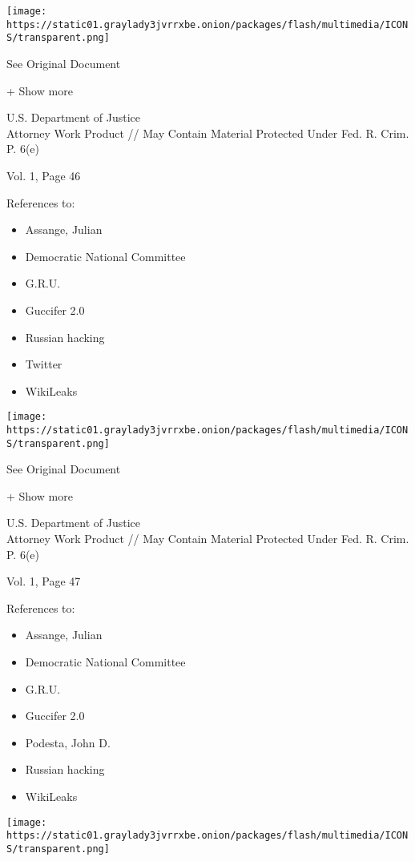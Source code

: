 \texttt{[image: https://static01.graylady3jvrrxbe.onion/packages/flash/multimedia/ICONS/transparent.png]}

See Original Document

+ Show more

U.S. Department of Justice\\
Attorney Work Product // May Contain Material Protected Under Fed. R.
Crim. P. 6(e)

Vol. 1, Page 46

References to:

\begin{itemize}
\tightlist
\item
  Assange, Julian
\item
  Democratic National Committee
\item
  G.R.U.
\item
  Guccifer 2.0
\item
  Russian hacking
\item
  Twitter
\item
  WikiLeaks
\end{itemize}

\protect\hyperlink{}{}

\texttt{[image: https://static01.graylady3jvrrxbe.onion/packages/flash/multimedia/ICONS/transparent.png]}

See Original Document

+ Show more

U.S. Department of Justice\\
Attorney Work Product // May Contain Material Protected Under Fed. R.
Crim. P. 6(e)

Vol. 1, Page 47

References to:

\begin{itemize}
\tightlist
\item
  Assange, Julian
\item
  Democratic National Committee
\item
  G.R.U.
\item
  Guccifer 2.0
\item
  Podesta, John D.
\item
  Russian hacking
\item
  WikiLeaks
\end{itemize}

\protect\hyperlink{}{}

\texttt{[image: https://static01.graylady3jvrrxbe.onion/packages/flash/multimedia/ICONS/transparent.png]}


